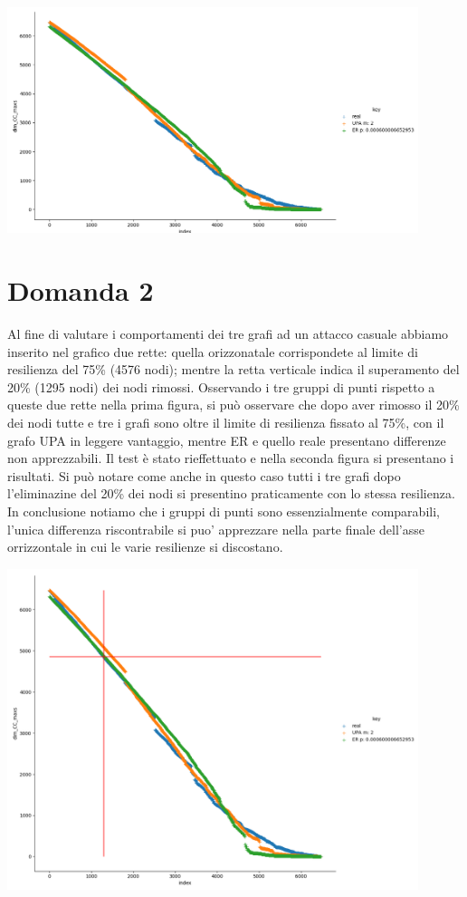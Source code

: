 \documentclass{article}
\begin{document}
\includegraphics[width=0.9\textwidth]{Figure_4}

\newpage
\section*{Domanda 2}
Al fine di valutare i comportamenti dei tre grafi ad un attacco casuale abbiamo inserito nel grafico due rette: quella orizzonatale corrispondete al limite di resilienza del 75\% (4576 nodi); mentre la retta verticale indica il superamento del 20\% (1295 nodi) dei nodi rimossi. 
Osservando i tre gruppi di punti rispetto a queste due rette nella prima figura, si può osservare che dopo aver rimosso il 20\% dei nodi tutte e tre i grafi sono oltre il limite di resilienza fissato al 75\%, con il grafo UPA in leggere vantaggio, mentre ER e quello reale presentano differenze non apprezzabili.
Il test è stato rieffettuato e nella seconda figura si presentano i risultati. Si può notare come anche in questo caso tutti i tre grafi dopo l'eliminazine del 20\% dei nodi si presentino praticamente con lo stessa resilienza.
In conclusione notiamo che i gruppi di punti sono essenzialmente comparabili, l'unica differenza riscontrabile si puo' apprezzare nella parte finale dell'asse orrizzontale in cui le varie resilienze si discostano.

\includegraphics[width=0.9\textwidth]{Figure_2}
\end{document}
